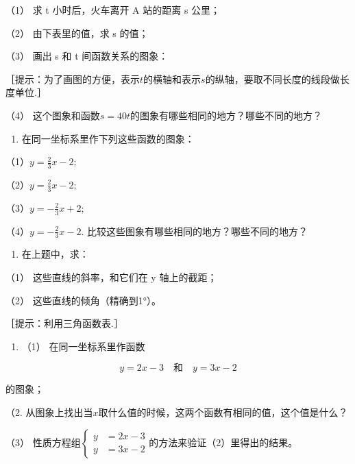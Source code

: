 （1） 求 t 小时后，火车离开 A 站的距离 s 公里；

（2） 由下表里的值，求 s 的值；

{\centering
\footnotesize\setlength{\tabcolsep}{2.6pt}%
\par
}

（3） 画出 s 和 t 间函数关系的图象：

［提示：为了画图的方便，表示\(t\)的横轴和表示\(s\)的纵轴，要取不同长度的线段做长度单位.］

（4） 这个图象和函数\(s = 40t\)的图象有哪些相同的地方？哪些不同的地方？

\begin{enumerate}[start=2]
\item
  在同一坐标系里作下列这些函数的图象：
\end{enumerate}

（1）\(y = \frac{2}{3} x - 2;\)

（2）\(y = \frac{2}{3} x - 2;\)

（3）\(y = -\frac{2}{3} x + 2;\)

（4）\(y = -\frac{2}{3} x - 2.\)
比较这些图象有哪些相同的地方？哪些不同的地方？

\begin{enumerate}[start=3]
\item
  在上题中，求：
\end{enumerate}

（1） 这些直线的斜率，和它们在 y 轴上的截距；

（2） 这些直线的倾角（精确到1°）。

［提示：利用三角函数表.］

\begin{enumerate}[start=4]
\item
  （1） 在同一坐标系里作函数
\end{enumerate}

\[
y = 2 x - 3 \quad \text{和} \quad y = 3 x - 2
\]

的图象；

（2.
从图象上找出当\(x\)取什么值的时候，这两个函数有相同的值，这个值是什么？

（3）
性质方程组\(\left\{\begin{aligned}y&=2x-3\\ y&=3x-2\end{aligned}\right.\)的方法来验证（2）里得出的结果。

